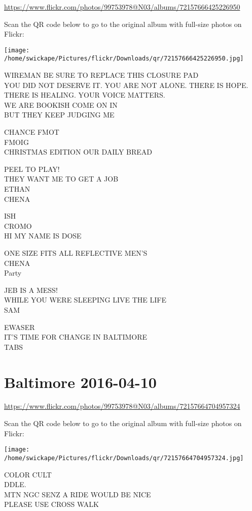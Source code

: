 \documentclass[10pt,letterpaper]{article}
\begin{document}
\url{https://www.flickr.com/photos/99753978@N03/albums/72157666425226950}

Scan the QR code below to go to the original album with full-size photos on Flickr:

\texttt{[image: /home/swickape/Pictures/flickr/Downloads/qr/72157666425226950.jpg]}


WIREMAN BE SURE TO REPLACE THIS CLOSURE PAD\\
YOU DID NOT DESERVE IT. YOU ARE NOT ALONE. THERE IS HOPE. THERE IS HEALING. YOUR VOICE MATTERS.\\
WE ARE BOOKISH COME ON IN\\
BUT THEY KEEP JUDGING ME

CHANCE FMOT\\
FMOIG\\
CHRISTMAS EDITION OUR DAILY BREAD

PEEL TO PLAY!\\
THEY WANT ME TO GET A JOB\\
ETHAN\\
CHENA

ISH\\
CROMO\\
HI MY NAME IS DOSE

ONE SIZE FITS ALL REFLECTIVE MEN'S\\
CHENA\\
Party

JEB IS A MESS!\\
WHILE YOU WERE SLEEPING LIVE THE LIFE\\
SAM

EWASER\\
IT'S TIME FOR CHANGE IN BALTIMORE\\
TABS


\section*{Baltimore 2016-04-10}

\url{https://www.flickr.com/photos/99753978@N03/albums/72157664704957324}

Scan the QR code below to go to the original album with full-size photos on Flickr:

\texttt{[image: /home/swickape/Pictures/flickr/Downloads/qr/72157664704957324.jpg]}


COLOR CULT\\
DDLE.\\
MTN NGC SENZ A RIDE WOULD BE NICE\\
PLEASE USE CROSS WALK
\end{document}
